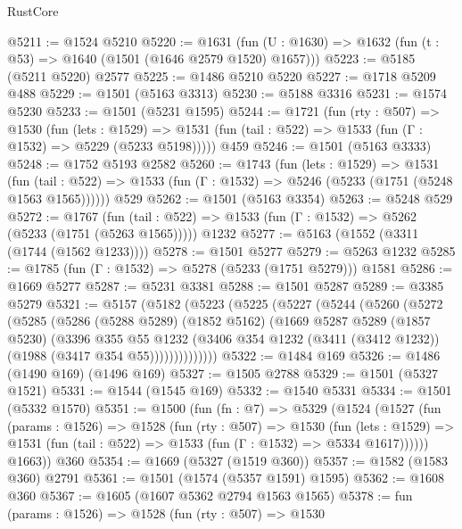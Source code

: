 \begin{lexlean}{RustCore}
\begin{coremodule}
@5211 := @1524 @5210
@5220 := @1631 (fun (U : @1630) => @1632 (fun (t : @53) => @1640 (@1501 (@1646 @2579 @1520) @1657)))
@5223 := @5185 (@5211 @5220) @2577
@5225 := @1486 @5210 @5220
@5227 := @1718 @5209 @488
@5229 := @1501 (@5163 @3313)
@5230 := @5188 @3316
@5231 := @1574 @5230
@5233 := @1501 (@5231 @1595)
@5244 := @1721
    (fun (rty : @507) =>
    @1530
      (fun (lets : @1529) =>
      @1531 (fun (tail : @522) => @1533 (fun (Γ : @1532) => @5229 (@5233 @5198)))))
    @459
@5246 := @1501 (@5163 @3333)
@5248 := @1752 @5193 @2582
@5260 := @1743
    (fun (lets : @1529) =>
    @1531
      (fun (tail : @522) => @1533 (fun (Γ : @1532) => @5246 (@5233 (@1751 (@5248 @1563 @1565))))))
    @529
@5262 := @1501 (@5163 @3354)
@5263 := @5248 @529
@5272 := @1767
    (fun (tail : @522) => @1533 (fun (Γ : @1532) => @5262 (@5233 (@1751 (@5263 @1565)))))
    @1232
@5277 := @5163 (@1552 (@3311 (@1744 (@1562 @1233))))
@5278 := @1501 @5277
@5279 := @5263 @1232
@5285 := @1785 (fun (Γ : @1532) => @5278 (@5233 (@1751 @5279))) @1581
@5286 := @1669 @5277
@5287 := @5231 @3381
@5288 := @1501 @5287
@5289 := @3385 @5279
@5321 := @5157
    (@5182
      (@5223
        (@5225
          (@5227
            (@5244
              (@5260
                (@5272
                  (@5285
                    (@5286
                      (@5288 @5289)
                      (@1852 @5162)
                      (@1669
                        @5287
                        @5289
                        (@1857 @5230)
                        (@3396
                          @355
                          @55
                          @1232
                          (@3406
                            @354
                            @1232
                            (@3411 (@3412 @1232))
                            (@1988 (@3417 @354 @55))))))))))))))
@5322 := @1484 @169
@5326 := @1486 (@1490 @169) (@1496 @169)
@5327 := @1505 @2788
@5329 := @1501 (@5327 @1521)
@5331 := @1544 (@1545 @169)
@5332 := @1540 @5331
@5334 := @1501 (@5332 @1570)
@5351 := @1500
    (fun (fn : @7) =>
    @5329
      (@1524
        (@1527
          (fun (params : @1526) =>
          @1528
            (fun (rty : @507) =>
            @1530
              (fun (lets : @1529) =>
              @1531 (fun (tail : @522) => @1533 (fun (Γ : @1532) => @5334 @1617))))))
        @1663))
    @360
@5354 := @1669 (@5327 (@1519 @360))
@5357 := @1582 (@1583 @360) @2791
@5361 := @1501 (@1574 (@5357 @1591) @1595)
@5362 := @1608 @360
@5367 := @1605 (@1607 @5362 @2794 @1563 @1565)
@5378 := fun (params : @1526) =>
  @1528
    (fun (rty : @507) =>
    @1530

\end{coremodule}
\end{lexlean}
